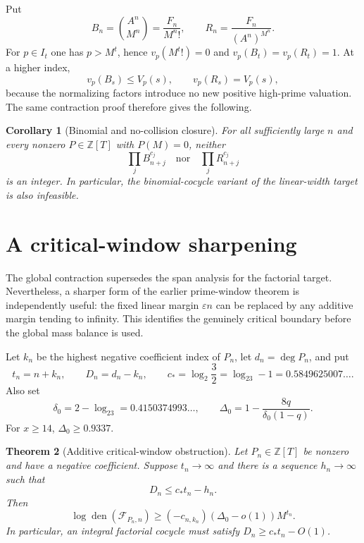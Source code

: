 \documentclass[11pt,oneside]{article}
\newtheorem{theorem}{Theorem}[section]
\newtheorem{corollary}[theorem]{Corollary}
\theoremstyle{definition}
\theoremstyle{remark}
\newcommand{\Z}{\mathbb Z}
\newcommand{\vp}[2]{v_{#1}\!\left(#2\right)}
\newcommand{\den}{\operatorname{den}}
\newcommand{\cstar}{c_{\!*}}
\newcommand{\FF}{\mathcal F}
\begin{document}
Put
\[
 B_n=\binom{A^n}{M^n}=\frac{F_n}{M^n!},
 \qquad
 R_n=\frac{F_n}{(A^n)^{M^n}}.
\]
For $p\in I_t$ one has $p>M^t$, hence $\vp p{M^t!}=0$ and
$\vp p{B_t}=\vp p{R_t}=1$.  At a higher index,
\[
 \vp p{B_s}\le V_p(s),\qquad \vp p{R_s}=V_p(s),
\]
because the normalizing factors introduce no new positive high-prime valuation.  The same
contraction proof therefore gives the following.

\begin{corollary}[Binomial and no-collision closure]
\label{cor:binomial-closure}
For all sufficiently large $n$ and every nonzero $P\in\Z[T]$ with $P(M)=0$, neither
\[
 \prod_jB_{n+j}^{c_j}
 \quad\text{nor}\quad
 \prod_jR_{n+j}^{c_j}
\]
is an integer.  In particular, the binomial-cocycle variant of the linear-width target is
also infeasible.
\end{corollary}

\section{A critical-window sharpening}
\label{sec:critical-window}

The global contraction supersedes the span analysis for the factorial target.  Nevertheless,
a sharper form of the earlier prime-window theorem is independently useful: the fixed
linear margin $\varepsilon n$ can be replaced by any additive margin tending to infinity.
This identifies the genuinely critical boundary before the global mass balance is used.

Let $k_n$ be the highest negative coefficient index of $P_n$, let $d_n=\deg P_n$, and put
\[
 t_n=n+k_n,
 \qquad D_n=d_n-k_n,
 \qquad
 \cstar=\log_2\frac32=\log_23-1=0.5849625007\ldots.
\]
Also set
\[
 \delta_0=2-\log_23=0.4150374993\ldots,
 \qquad
 \Delta_0=1-\frac{8q}{\delta_0(1-q)}.
\]
For $x\ge14$, $\Delta_0\ge0.9337$.

\begin{theorem}[Additive critical-window obstruction]
\label{thm:additive-window}
Let $P_n\in\Z[T]$ be nonzero and have a negative coefficient.  Suppose $t_n\to\infty$ and
there is a sequence $h_n\to\infty$ such that
\begin{equation}
 D_n\le\cstar t_n-h_n.                              \label{eq:additive-window-hyp}
\end{equation}
Then
\begin{equation}
 \log\den(\FF_{P_n,n})
 \ge(-c_{n,k_n})(\Delta_0-o(1))M^{t_n}.              \label{eq:additive-window-concl}
\end{equation}
In particular, an integral factorial cocycle must satisfy
$D_n\ge\cstar t_n-O(1)$.
\end{theorem}
\end{document}

